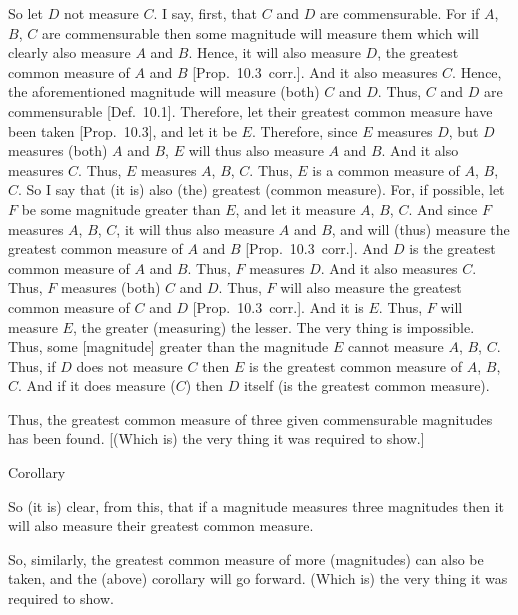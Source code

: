 So let $D$ not measure $C$. I say, first, that $C$ and $D$ are
commensurable. For if $A$, $B$, $C$ are commensurable then some
magnitude will measure them which will clearly also measure $A$ and $B$.
Hence, it will also measure $D$, the greatest common measure of $A$ and $B$ [Prop.~10.3~corr.]. And it also measures
$C$. Hence, the aforementioned magnitude will measure (both)
$C$ and $D$. Thus, $C$ and $D$ are commensurable [Def.~10.1]. Therefore, let their
greatest common measure have been taken [Prop.~10.3], and let it be $E$. Therefore, since
$E$ measures $D$, but $D$ measures (both) $A$ and $B$, $E$ will
thus also measure $A$ and $B$. And it also measures $C$. Thus,
$E$ measures $A$, $B$, $C$. Thus, $E$ is a common measure of $A$, $B$, $C$.  So I say that (it is) also (the) greatest (common measure). For, if
possible, let $F$ be some magnitude greater than $E$, and let it
measure $A$, $B$, $C$. And since $F$ measures $A$, $B$, $C$, it will
thus also measure $A$ and $B$, and  will (thus) measure the greatest common measure of $A$ and $B$ [Prop.~10.3~corr.].  And
$D$ is the greatest common measure of $A$ and $B$.  Thus, $F$ measures $D$. And it also measures $C$. Thus, $F$ measures (both) $C$ and $D$.
Thus, $F$ will also measure the greatest common measure of $C$ and $D$  [Prop.~10.3~corr.].
And it is $E$. Thus, $F$ will measure $E$, the greater (measuring)
the lesser. The very thing is impossible. Thus, some [magnitude]
greater than the magnitude $E$ cannot measure $A$, $B$, $C$. Thus,
if $D$ does not
measure $C$ then
$E$ is the greatest common measure of $A$, $B$, $C$.  And if it does measure ($C$) then $D$ itself (is the
greatest common measure).

Thus, the greatest common measure  of three given
commensurable magnitudes has been found.  [(Which is) the very thing it was required to
show.]\\

\begin{center}
{\large Corollary}
\end{center}\vspace*{-7pt}

So (it is) clear, from this, that if a magnitude measures three
magnitudes then it will also measure their greatest common measure.

So, similarly, the greatest common measure of more (magnitudes) can also be
taken, and the (above) corollary will go forward. (Which is) the very thing
it was required to show.~\\

